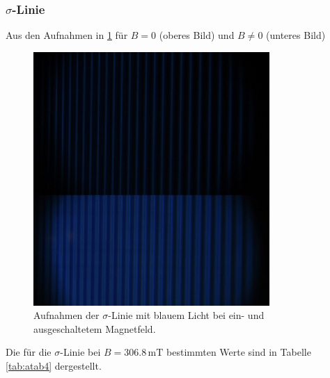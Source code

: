 \subsubsection*{$\sigma$-Linie}
Aus den Aufnahmen in \ref{fig:afig4} für $B = 0$ (oberes Bild) und $B \neq 0$ (unteres Bild)
\FloatBarrier
\begin{figure}
    \centering
    \includegraphics[width=0.8\textwidth]{sigma.jpg}
    \caption{Aufnahmen der $\sigma$-Linie mit blauem Licht bei ein- und ausgeschaltetem Magnetfeld.}
    \label{fig:afig4}
\end{figure}
\FloatBarrier
Die für die $\sigma$-Linie bei $B = 306.8 \, \si{\milli\tesla}$ bestimmten Werte sind in Tabelle \ref{tab:atab4} dergestellt.
\FloatBarrier
